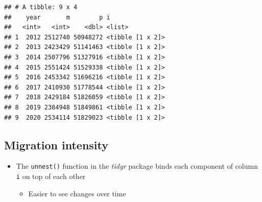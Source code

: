 \documentclass[
]{book}
\newenvironment{Shaded}{\begin{snugshade}}{\end{snugshade}}
\newcommand{\AttributeTok}[1]{\textcolor[rgb]{0.77,0.63,0.00}{#1}}
\newcommand{\ConstantTok}[1]{\textcolor[rgb]{0.00,0.00,0.00}{#1}}
\newcommand{\FunctionTok}[1]{\textcolor[rgb]{0.00,0.00,0.00}{#1}}
\newcommand{\NormalTok}[1]{#1}
\newcommand{\OtherTok}[1]{\textcolor[rgb]{0.56,0.35,0.01}{#1}}
\newcommand{\SpecialCharTok}[1]{\textcolor[rgb]{0.00,0.00,0.00}{#1}}
\providecommand{\tightlist}{%
  \setlength{\itemsep}{0pt}\setlength{\parskip}{0pt}}
\begin{document}
\begin{Shaded}
\end{Shaded}

\begin{verbatim}
## # A tibble: 9 x 4
##    year       m        p i               
##   <int>   <int>    <dbl> <list>          
## 1  2012 2512740 50948272 <tibble [1 x 2]>
## 2  2013 2423429 51141463 <tibble [1 x 2]>
## 3  2014 2507796 51327916 <tibble [1 x 2]>
## 4  2015 2551424 51529338 <tibble [1 x 2]>
## 5  2016 2453342 51696216 <tibble [1 x 2]>
## 6  2017 2410930 51778544 <tibble [1 x 2]>
## 7  2018 2429184 51826059 <tibble [1 x 2]>
## 8  2019 2384948 51849861 <tibble [1 x 2]>
## 9  2020 2534114 51829023 <tibble [1 x 2]>
\end{verbatim}

\hypertarget{migration-intensity-11}{%
\subsection{Migration intensity}\label{migration-intensity-11}}

\begin{itemize}
\tightlist
\item
  The \texttt{unnest()} function in the \emph{tidyr} package binds each component of column \texttt{i} on top of each other

  \begin{itemize}
  \tightlist
  \item
    Easier to see changes over time
  \end{itemize}
\end{itemize}
\end{document}
